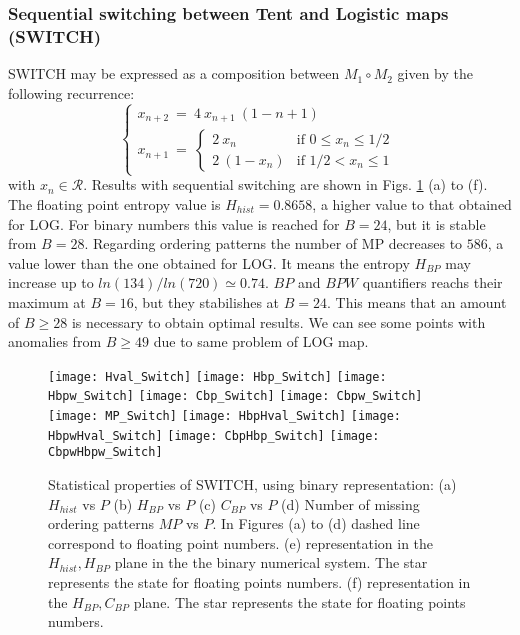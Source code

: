 \subsubsection{Sequential switching between Tent and Logistic maps (SWITCH)} \label{sssec:switch}

SWITCH may be expressed as a composition between $M_1 \circ M_2$ given by the following recurrence:
%
\[ \left\{ \begin{array}{ccc}\label{eq:seq}
x_{n+2}~=~ 4~x_{n+1}~(1-{n+1}) \\
x_{n+1}~=~ \left\{ \begin{array}{ll}
2~{x_n} & \textrm{if $0\leq x_n\leq 1/2$}\\
2~(1-{x_n}) & \textrm{if $1/2<x_n\leq 1$} 
\end{array} \right.  \end{array}\right. \] 
with $x_n\in\mathcal{R}$.
%
Results with sequential switching are shown in Figs. \ref{fig:seqbin} (a) to (f).
The floating point entropy value is $H_{hist}=0.8658$, a higher value to that obtained for LOG. 
For binary numbers this value is reached for $B=24$, but it is stable from $B=28$.
Regarding ordering patterns the number of MP decreases to $586$, a value lower than the one obtained for LOG.
It means the entropy $H_{BP}$ may increase up to $ln(134)/ln(720)\simeq 0.74$.
$BP$ and $BPW$ quantifiers reachs their maximum at $B=16$, but they stabilishes at $B=24$.
This means that an amount of $B \geq 28$ is necessary to obtain optimal results.
We can see some points with anomalies from $B \geq 49$ due to same problem of LOG map.

\begin{figure}
	\texttt{[image: Hval\_Switch]}
	\texttt{[image: Hbp\_Switch]}
	\texttt{[image: Hbpw\_Switch]}
	\texttt{[image: Cbp\_Switch]}
	\texttt{[image: Cbpw\_Switch]}
	\texttt{[image: MP\_Switch]}
	\texttt{[image: HbpHval\_Switch]}
	\texttt{[image: HbpwHval\_Switch]}
	\texttt{[image: CbpHbp\_Switch]}
	\texttt{[image: CbpwHbpw\_Switch]}
	\caption{Statistical properties of SWITCH,  using binary representation: (a) $H_{hist}$ vs $P$ (b) $H_{BP}$ vs $P$ (c) $C_{BP}$ vs $P$ (d) Number of missing ordering patterns $MP$ vs $P$. In Figures (a) to (d) dashed line correspond to floating point numbers. (e) representation in the $H_{hist},H_{BP}$ plane in the the binary numerical system.  The star represents the state for floating points numbers. (f) representation in the $H_{BP},C_{BP}$ plane.  The star represents the state for floating points numbers.  } \label{fig:seqbin}
\end{figure}
